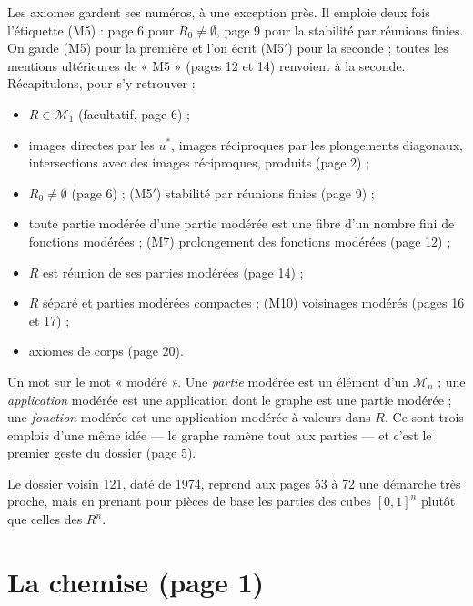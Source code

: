 \documentclass[11pt,a4paper]{article}
\begin{document}
Les axiomes gardent ses numéros, à une exception près. Il emploie deux fois
l'étiquette (M5) : page 6 pour $R_0 \neq \emptyset$, page 9 pour la stabilité
par réunions finies. On garde (M5) pour la première et l'on écrit (M5$'$) pour
la seconde ; toutes les mentions ultérieures de « M5 » (pages 12 et 14)
renvoient à la seconde. Récapitulons, pour s'y retrouver :

\begin{itemize}
\item[(M0)] $R \in \mathcal{M}_1$ (facultatif, page 6) ;
\item[(M1)--(M4)] images directes par les $u^*$, images réciproques par les
  plongements diagonaux, intersections avec des images réciproques, produits
  (page 2) ;
\item[(M5)] $R_0 \neq \emptyset$ (page 6) ; \quad (M5$'$) stabilité par
  réunions finies (page 9) ;
\item[(M6)] toute partie modérée d'une partie modérée est une fibre d'un
  nombre fini de fonctions modérées ; (M7) prolongement des fonctions modérées
  (page 12) ;
\item[(M8)] $R$ est réunion de ses parties modérées (page 14) ;
\item[(M9)] $R$ séparé et parties modérées compactes ; (M10) voisinages
  modérés (pages 16 et 17) ;
\item[(M11)] axiomes de corps (page 20).
\end{itemize}

Un mot sur le mot « modéré ». Une \emph{partie} modérée est un élément d'un
$\mathcal{M}_n$ ; une \emph{application} modérée est une application dont le
graphe est une partie modérée ; une \emph{fonction} modérée est une application
modérée à valeurs dans $R$. Ce sont trois emplois d'une même idée — le graphe
ramène tout aux parties — et c'est le premier geste du dossier (page 5).

Le dossier voisin 121, daté de 1974, reprend aux pages 53 à 72 une démarche
très proche, mais en prenant pour pièces de base les parties des cubes
$[0,1]^n$ plutôt que celles des $R^n$.

\section*{La chemise (page 1)}
\end{document}
